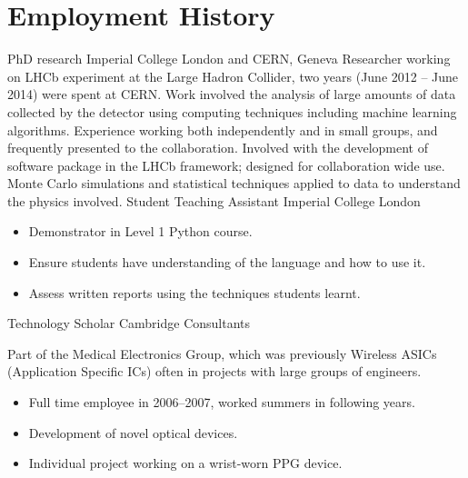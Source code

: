 \section{Employment History}
{PhD research}
{Imperial College London and CERN, Geneva}
{}{}
{
  Researcher working on LHCb experiment at the Large Hadron Collider, two years (June 2012 -- June
  2014) were spent at CERN.
  Work involved the analysis of large amounts of data collected by the detector using computing
  techniques including machine learning algorithms.
  Experience working both independently and in small groups, and frequently presented to the
  collaboration.
  Involved with the development of software package in the LHCb framework; designed for
  collaboration wide use.
  Monte Carlo simulations and statistical techniques applied to data to understand the physics
  involved.
}
{Student Teaching Assistant}
{Imperial College London}
{}{}
{
  \begin{itemize}
    \item Demonstrator in Level 1 Python course.
    \item Ensure students have understanding of the language and how to use it.
    \item Assess written reports using the techniques students learnt.
  \end{itemize}
}
{Technology Scholar}
{Cambridge Consultants}
{}{}
{
  Part of the Medical Electronics Group, which was previously Wireless ASICs (Application
  Specific ICs) often in projects with large groups of engineers.
  \begin{itemize}
    \item Full time employee in 2006--2007, worked summers in following years.
    \item Development of novel optical devices.
    \item Individual project working on a wrist-worn PPG device.
  \end{itemize}
}


